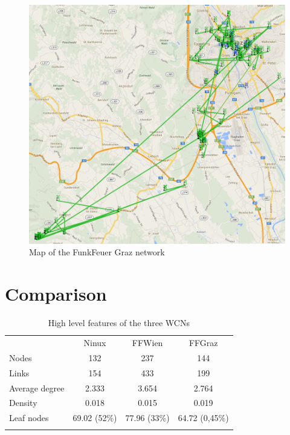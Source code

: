 \documentclass[a4paper,11pt,twoside,openright]{memoir}
\begin{document}
\begin{figure}[!htb]
  \centering
  \includegraphics{images/graz_map.png}
  \caption{Map of the FunkFeuer Graz network}
  \label{fig:graz_map}
\end{figure}

\clearpage
\section{Comparison}\label{comparison}

\begin{table}
  \centering
  \begin{tabular}{@{}lccc@{}}
    \toprule\addlinespace
    & Ninux & FFWien & FFGraz
    \\\addlinespace
    \midrule
    Nodes & 132 & 237 & 144
    \\\addlinespace
    Links & 154 & 433 & 199
    \\\addlinespace
    Average degree & 2.333 & 3.654 & 2.764
    \\\addlinespace
    Density & 0.018 & 0.015 & 0.019
    \\\addlinespace
    Leaf nodes & 69.02 (52\%) & 77.96 (33\%) & 64.72 (0,45\%)
    \\\addlinespace
    \bottomrule
    \addlinespace
  \end{tabular}
  \caption{High level features of the three WCNs}
\end{table}
\end{document}

